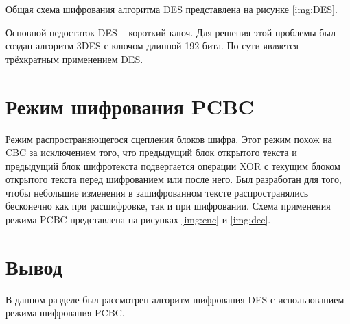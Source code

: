 \FloatBarrier

Общая схема шифрования алгоритма DES представлена на рисунке \ref{img:DES}.

\FloatBarrier

Основной недостаток DES – короткий ключ. Для решения этой проблемы был создан алгоритм 3DES с ключом длинной 192 бита. По сути является трёхкратным применением DES.

\section{Режим шифрования PCBC}

Режим распространяющегося сцепления блоков шифра. Этот режим похож на CBC за исключением того, что предыдущий блок открытого текста и предыдущий блок шифротекста подвергается операции XOR с текущим блоком открытого текста перед шифрованием или после него. Был разработан для того, чтобы небольшие изменения в зашифрованном тексте распространялись бесконечно как при расшифровке, так и при шифровании. Схема применения режима PCBC представлена на рисунках \ref{img:enc} и \ref{img:dec}.

\FloatBarrier

\section*{Вывод}

В данном разделе был рассмотрен алгоритм шифрования DES с использованием режима шифрования PCBC.

